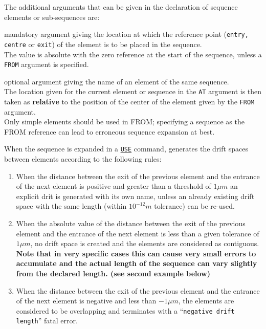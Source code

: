The additional arguments that can be given in the declaration of sequence 
elements or sub-sequences are: 
\begin{madlist}
   mandatory argument giving the location at
  which the reference point ({\tt entry, centre} or {\tt exit}) of
  the element is to be placed in the sequence. \\
  The value is absolute with the zero reference at the start of the
  sequence, unless a {\tt FROM} argument is specified.

   optional argument giving the name of an
  element of the same sequence. \\
  The location given for the current element or sequence in the {\tt AT}
  argument is then taken as {\bf relative}  to the position of the
  center of the element given by the {\tt FROM} argument. \\
  Only simple elements should be used in FROM; specifying a sequence 
  as the FROM reference can lead to erroneous sequence expansion at best.  
\end{madlist}


When the sequence is expanded in a \hyperref[sec:use]{\tt USE} 
command, \madx generates the drift spaces between elements according to
the following rules: 
\begin{enumerate}
\item When the distance between the exit of the previous element and the
  entrance of the next element is positive and greater than a threshold
  of $1 \mu m$ an explicit drit is generated with its own name, unless
  an already existing drift space with the same length (within $10^{-12}
  m$ tolerance) can be re-used.
\item When the absolute value of the distance between the exit of the 
  previous element and the entrance of the next element is less than a
  given tolerance of $1\mu m$, no drift space is created and the
  elements are considered as contiguous. \\
  {\bf Note that in very specific cases this can cause very small errors
    to accumulate and the actual length of the sequence can vary
    slightly from the declared length. (see second example below)} 
\item When the distance between the exit of the previous element and the 
  entrance of the next element is negative and less than $-1\mu m$,
  the elements are considered to be overlapping and \madx terminates
  with a ``{\tt negative drift length}'' fatal error. 
\end{enumerate} 

